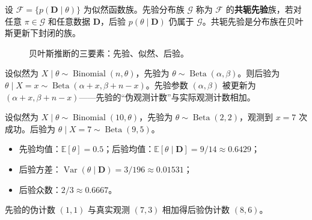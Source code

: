 \begin{definition}[共轭先验]\label{def:conjugate_prior}
设 $\mathcal{F} = \{p(\mathbf{D} \mid \theta)\}$ 为似然函数族。先验分布族 $\mathcal{G}$ 称为 $\mathcal{F}$ 的\textbf{共轭先验}族，若对任意 $\pi \in \mathcal{G}$ 和任意数据 $\mathbf{D}$，后验 $p(\theta \mid \mathbf{D})$ 仍属于 $\mathcal{G}$。共轭先验是分布族在贝叶斯更新下封闭的族。
\end{definition}

\begin{figure}[htbp]
\centering
{}
\caption{贝叶斯推断的三要素：先验、似然、后验。}
\label{fig:bayes_framework}
\end{figure}

\begin{example}\label{ex:beta_binomial}
设似然为 $X \mid \theta \sim \operatorname{Binomial}(n, \theta)$，先验为 $\theta \sim \operatorname{Beta}(\alpha, \beta)$。则后验为 $\theta \mid X = x \sim \operatorname{Beta}(\alpha + x, \beta + n - x)$。先验参数 $(\alpha, \beta)$ 被更新为 $(\alpha + x, \beta + n - x)$——先验的“伪观测计数”与实际观测计数相加。
\end{example}

\begin{example}\label{ch14_beta_binomial_numeric}
设似然为 $X \mid \theta \sim \operatorname{Binomial}(10, \theta)$，先验为 $\theta \sim \operatorname{Beta}(2, 2)$，观测到 $x = 7$ 次成功。后验为 $\theta \mid X = 7 \sim \operatorname{Beta}(9, 5)$。
\begin{itemize}
    \item 先验均值：$\mathbb{E}[\theta] = 0.5$；后验均值：$\mathbb{E}[\theta \mid \mathbf{D}] = 9/14 \approx 0.6429$；
    \item 后验方差：$\operatorname{Var}(\theta \mid \mathbf{D}) = 3/196 \approx 0.01531$；
    \item 后验众数：$2/3 \approx 0.6667$。
\end{itemize}
先验的伪计数 $(1, 1)$ 与真实观测 $(7, 3)$ 相加得后验伪计数 $(8, 6)$。
\end{example}

